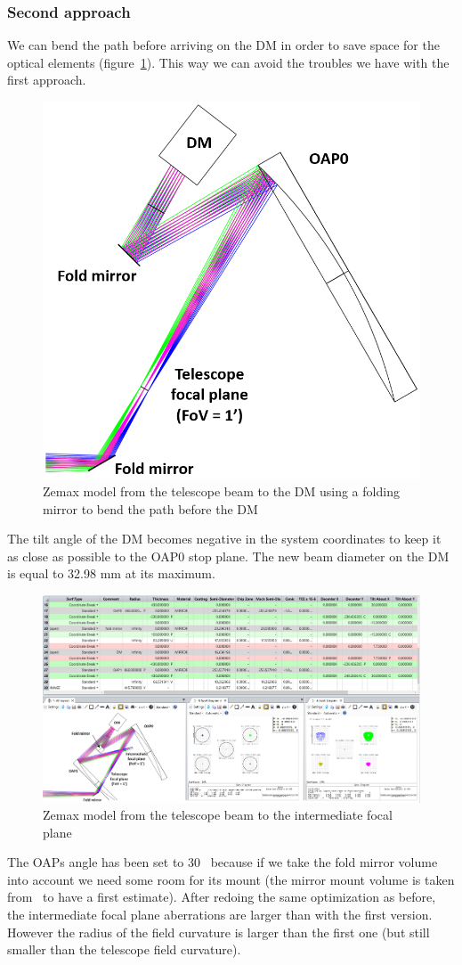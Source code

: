 \documentclass[12pt,a4paper]{article}
\begin{document}
\subsubsection{Second approach}
We can bend the path before arriving on the DM in order to save space for the optical elements (figure~\ref{fig:FP_DM_FoldMirror}). This way we can avoid the troubles we have with the first approach.
\begin{figure}[H]
	\begin{center}
		\includegraphics[width=.4\textwidth]{images/FP_DM_FoldMirror.PNG}
		\caption{Zemax model from the telescope beam to the DM using a folding mirror to bend the path before the DM}\label{fig:FP_DM_FoldMirror}
	\end{center}
\end{figure}
The tilt angle of the DM becomes negative in the system coordinates to keep it as close as possible to the OAP0 stop plane. The new beam diameter on the DM is equal to 32.98 mm at its maximum.
\begin{figure}[H]
	\begin{center}
		\includegraphics[width=.8\textwidth]{images/Zemax_model_FP_OAP1_2nd_approach.PNG}
		\caption{Zemax model from the telescope beam to the intermediate focal plane}\label{fig:Zemax_model_FP_OAP1_2nd_approach}
	\end{center}
\end{figure}
The OAPs angle has been set to 30\degree~ because if we take the fold mirror volume into account we need some room for its mount (the mirror mount volume is taken from~\cite{cite:ThorlabsKS2} to have a first estimate). After redoing the same optimization as before, the intermediate focal plane aberrations are larger than with the first version. However the radius of the field curvature is larger than the first one (but still smaller than the telescope field curvature).
\end{document}
